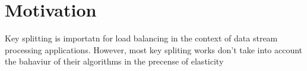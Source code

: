 \chapter{Motivation
\label{chapter:motivation}}



Key splitting is importatn for load balancing in the context of data stream processing applications. However, most key spliting works don't take into account the bahaviur of their algorithms in the precense of elasticity
